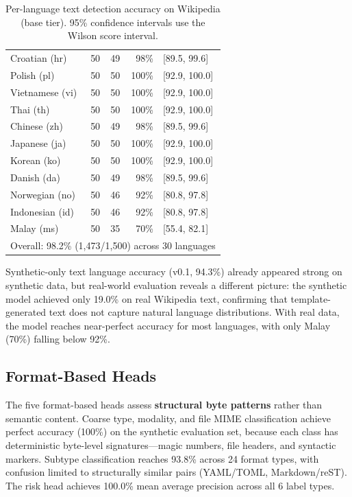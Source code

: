 \documentclass[11pt,a4paper]{article}
\begin{document}
\begin{table}[h]
\begin{tabular}{lrrrl}
Croatian (hr)    & 50 & 49 & 98\% & {[}89.5, 99.6{]} \\
Polish (pl)      & 50 & 50 & 100\% & {[}92.9, 100.0{]} \\
Vietnamese (vi)  & 50 & 50 & 100\% & {[}92.9, 100.0{]} \\
Thai (th)        & 50 & 50 & 100\% & {[}92.9, 100.0{]} \\
Chinese (zh)     & 50 & 49 & 98\% & {[}89.5, 99.6{]} \\
Japanese (ja)    & 50 & 50 & 100\% & {[}92.9, 100.0{]} \\
Korean (ko)      & 50 & 50 & 100\% & {[}92.9, 100.0{]} \\
Danish (da)      & 50 & 49 & 98\% & {[}89.5, 99.6{]} \\
Norwegian (no)   & 50 & 46 & 92\% & {[}80.8, 97.8{]} \\
Indonesian (id)  & 50 & 46 & 92\% & {[}80.8, 97.8{]} \\
Malay (ms)       & 50 & 35 & 70\% & {[}55.4, 82.1{]} \\
\midrule
\multicolumn{5}{l}{Overall: 98.2\% (1,473/1,500) across 30 languages} \\
\bottomrule
\end{tabular}
\caption{\label{tab:text_per_lang} Per-language text detection accuracy on Wikipedia (base tier). 95\% confidence intervals use the Wilson score interval.}
\end{table}

Synthetic-only text language accuracy (v0.1, 94.3\%) already appeared strong on synthetic data, but real-world evaluation reveals a different picture: the synthetic model achieved only 19.0\% on real Wikipedia text, confirming that template-generated text does not capture natural language distributions.
With real data, the model reaches near-perfect accuracy for most languages, with only Malay (70\%) falling below 92\%.

\subsection{Format-Based Heads}

The five format-based heads assess \textbf{structural byte patterns} rather than semantic content.
Coarse type, modality, and file MIME classification achieve perfect accuracy (100\%) on the synthetic evaluation set, because each class has deterministic byte-level signatures---magic numbers, file headers, and syntactic markers.
Subtype classification reaches 93.8\% across 24 format types, with confusion limited to structurally similar pairs (YAML/TOML, Markdown/reST).
The risk head achieves 100.0\% mean average precision across all 6 label types.
\end{document}
